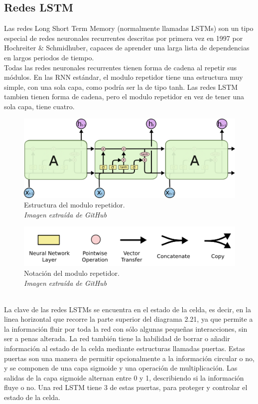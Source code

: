 \subsection{Redes LSTM}
Las redes Long Short Term Memory (normalmente llamadas LSTMs) son un tipo especial de redes neuronales recurrentes descritas por primera vez en 1997 por Hochreiter \& Schmidhuber, capaces de aprender una larga lista de dependencias en largos periodos de tiempo.\\
Todas las redes neuronales recurrentes tienen forma de cadena al repetir sus módulos. En las RNN estándar, el modulo repetidor tiene una estructura muy simple, con una sola capa, como podría ser la de tipo tanh. Las redes LSTM tambien tienen forma de cadena, pero el modulo repetidor en vez de tener una sola capa, tiene cuatro.
\begin{figure}[htp]
\centering
\includegraphics[scale=0.35]{images/LSTM3-chain.png}
\caption{Estructura del modulo repetidor.\\\textit{Imagen extraída de GitHub}}
\end{figure}
\begin{figure}[htp]
\centering
\includegraphics[scale=0.2]{images/LSTM2-notation.png}
\caption{Notación del modulo repetidor.\\\textit{Imagen extraída de GitHub}}
\end{figure}
\\La clave de las redes LSTMs se encuentra en el estado de la celda, es decir, en la linea horizontal que recorre la parte superior del diagrama 2.21, ya que permite a la información fluir por toda la red con sólo algunas pequeñas interacciones, sin ser a penas alterada.
La red también tiene la habilidad de borrar o añadir información al estado de la celda mediante estructuras llamadas puertas. Estas puertas son una manera de permitir opcionalmente a la información circular o no, y se componen de una capa sigmoide y una operación de multiplicación. Las salidas de la capa sigmoide alternan entre 0 y 1, describiendo si la información fluye o no. Una red LSTM tiene 3 de estas puertas, para proteger y controlar el estado de la celda.\\\\

